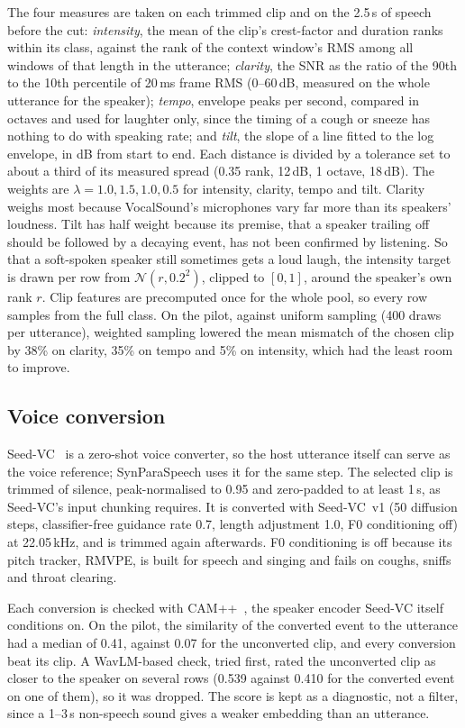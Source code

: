 \documentclass{article} %
\begin{document}
The four measures are taken on each trimmed clip and on the 2.5\,s of speech before the cut:
\emph{intensity}, the mean of the clip's crest-factor and duration ranks within its class,
against the rank of the context window's RMS among all windows of that length in the utterance;
\emph{clarity}, the SNR as the ratio of the 90th to the 10th percentile of 20\,ms frame RMS
(0--60\,dB, measured on the whole utterance for the speaker); \emph{tempo}, envelope peaks per
second, compared in octaves and used for laughter only, since the timing of a cough or sneeze
has nothing to do with speaking rate; and \emph{tilt}, the slope of a line fitted to the log
envelope, in dB from start to end. Each distance is divided by a tolerance set to about a third
of its measured spread (0.35 rank, 12\,dB, 1 octave, 18\,dB). The weights are
$\lambda = 1.0, 1.5, 1.0, 0.5$ for intensity, clarity, tempo and tilt. Clarity weighs most
because VocalSound's microphones vary far more than its speakers' loudness. Tilt has half weight
because its premise, that a speaker trailing off should be followed by a decaying event, has not
been confirmed by listening. So that a soft-spoken speaker still sometimes gets a loud laugh, the
intensity target is drawn per row from $\mathcal{N}(r, 0.2^2)$, clipped to $[0,1]$, around the
speaker's own rank $r$. Clip features are precomputed once for the whole pool, so every row
samples from the full class. On the pilot, against uniform sampling (400 draws per utterance),
weighted sampling lowered the mean mismatch of the chosen clip by 38\% on clarity, 35\% on tempo
and 5\% on intensity, which had the least room to improve.

\subsection{Voice conversion}
Seed-VC~\citep{seedvc} is a zero-shot voice converter, so the host utterance itself can serve as
the voice reference; SynParaSpeech uses it for the same step. The selected clip is trimmed of
silence, peak-normalised to 0.95 and zero-padded to at least 1\,s, as Seed-VC's input chunking
requires. It is converted with Seed-VC~v1 (50 diffusion steps, classifier-free guidance rate 0.7,
length adjustment 1.0, F0 conditioning off) at 22.05\,kHz, and is trimmed again afterwards. F0
conditioning is off because its pitch tracker, RMVPE, is built for speech and singing and fails
on coughs, sniffs and throat clearing.

Each conversion is checked with CAM++~\citep{campplus}, the speaker encoder Seed-VC itself
conditions on. On the pilot, the similarity of the converted event to the utterance had a median
of 0.41, against 0.07 for the unconverted clip, and every conversion beat its clip. A
WavLM-based check, tried first, rated the unconverted clip as closer to the speaker on several
rows (0.539 against 0.410 for the converted event on one of them), so it was dropped. The score
is kept as a diagnostic, not a filter, since a 1--3\,s non-speech sound gives a weaker embedding
than an utterance.
\end{document}
